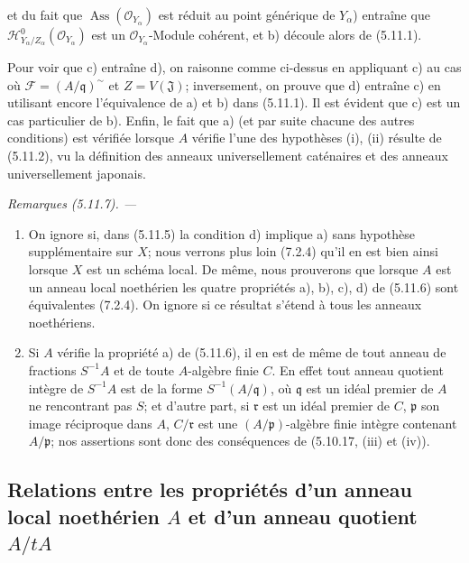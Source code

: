 \documentclass[10pt,oneside]{book}
\newcommand{\oldpage}[2][]{%
  \setcounter{footnote}{0}%
  \marginpar{\scriptsize\textbf{#1}~|~#2}\ignorespaces}
\newenvironment{remarks}[1][]{%
  \par\medskip\noindent\itshape Remarques (#1). ---\ }{\par}
\begin{document}
\oldpage[IV-2]{126}

et du fait que $\operatorname{Ass}(\mathcal O_{Y_\alpha})$ est réduit au point
générique de $Y_\alpha$) entraîne que
$\mathcal H^0_{Y_\alpha/Z_\alpha}(\mathcal O_{Y_\alpha})$ est un
$\mathcal O_{Y_\alpha}$-Module cohérent, et b) découle alors de (5.11.1).

Pour voir que c) entraîne d), on raisonne comme ci-dessus en appliquant c) au
cas où $\mathcal F=(A/\mathfrak q)^\sim$ et $Z=V(\mathfrak J)$;
inversement, on prouve que d) entraîne c) en utilisant encore l'équivalence de
a) et b) dans (5.11.1). Il est évident que c) est un cas particulier de b).
Enfin, le fait que a) (et par suite chacune des autres conditions) est vérifiée
lorsque $A$ vérifie l'une des hypothèses (i), (ii) résulte de (5.11.2), vu la
définition des anneaux universellement caténaires et des anneaux
universellement japonais.

\begin{remarks}[5.11.7]
\label{IV.2.s5.11.7-fr}
\begin{enumerate}
\item[(i)] On ignore si, dans (5.11.5) la condition d) implique a) sans
hypothèse supplémentaire sur $X$; nous verrons plus loin (7.2.4) qu'il en est
bien ainsi lorsque $X$ est un schéma local. De même, nous prouverons que
lorsque $A$ est un anneau local noethérien les quatre propriétés a), b), c),
d) de (5.11.6) sont équivalentes (7.2.4). On ignore si ce résultat s'étend à
tous les anneaux noethériens.
\item[(ii)] Si $A$ vérifie la propriété a) de (5.11.6), il en est de même de
tout anneau de fractions $S^{-1}A$ et de toute $A$-algèbre finie $C$. En effet
tout anneau quotient intègre de $S^{-1}A$ est de la forme
$S^{-1}(A/\mathfrak q)$, où $\mathfrak q$ est un idéal premier de $A$ ne
rencontrant pas $S$; et d'autre part, si $\mathfrak r$ est un idéal premier de
$C$, $\mathfrak p$ son image réciproque dans $A$, $C/\mathfrak r$ est une
$(A/\mathfrak p)$-algèbre finie intègre contenant $A/\mathfrak p$; nos
assertions sont donc des conséquences de (5.10.17, (iii) et (iv)).
\end{enumerate}
\end{remarks}

\subsection{\texorpdfstring{Relations entre les propriétés d'un anneau local noethérien $A$ et
d'un anneau quotient $A/tA$}{Relations entre les propriétés d'un anneau local noethérien A et d'un anneau quotient A/tA}}
\end{document}
